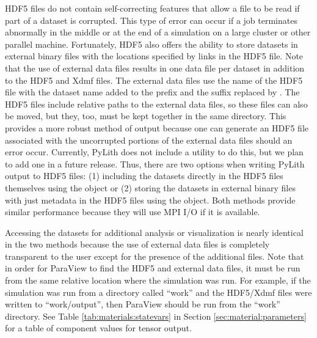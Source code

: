 HDF5 files do not contain self-correcting features that allow a file
to be read if part of a dataset is corrupted. This type of error can
occur if a job terminates abnormally in the middle or at the end of a
simulation on a large cluster or other parallel machine. Fortunately,
HDF5 also offers the ability to store datasets in external binary
files with the locations specified by links in the HDF5 file. Note
that the use of external data files results in one data file per
dataset in addition to the HDF5 and Xdmf files. The external data
files use the name of the HDF5 file with the dataset name added to the
prefix and the  suffix replaced by . The
HDF5 files include relative paths to the external data files, so these
files can also be moved, but they, too, must be kept together in the
same directory. This provides a more robust method of output because
one can generate an HDF5 file associated with the uncorrupted portions
of the external data files should an error occur. Currently, PyLith
does not include a utility to do this, but we plan to add one in a
future release. Thus, there are two options when writing PyLith output
to HDF5 files: (1) including the datasets directly in the HDF5 files
themselves using the  object or (2) storing the
datasets in external binary files with just metadata in the HDF5 files
using the  object. Both methods provide
similar performance because they will use MPI I/O if it is available.


Accessing the datasets for additional analysis or visualization is
nearly identical in the two methods because the use of external data
files is completely transparent to the user except for the presence
of the additional files. Note that in order for ParaView to find the
HDF5 and external data files, it must be run from the same relative
location where the simulation was run. For example, if the simulation
was run from a directory called ``work'' and the HDF5/Xdmf files
were written to ``work/output'', then ParaView should be run from
the ``work'' directory. See Table \vref{tab:materials:statevars}
in Section \vref{sec:material:parameters} for a table of component
values for tensor output.

